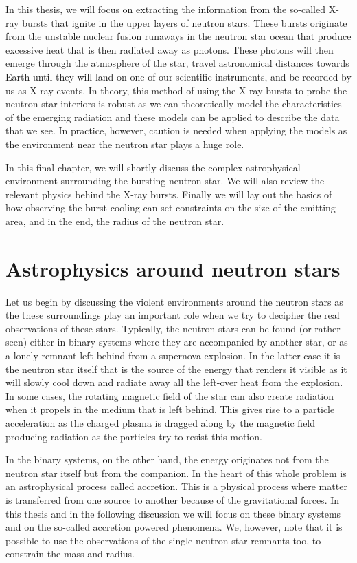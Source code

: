 In this thesis, we will focus on extracting the information from the so-called X-ray bursts that ignite in the upper layers of neutron stars.
These bursts originate from the unstable nuclear fusion runaways in the neutron star ocean that produce excessive heat that is then radiated away as photons.
These photons will then emerge through the atmosphere of the star, travel astronomical distances towards Earth until they will land on one of our scientific instruments, and be recorded by us as X-ray events.
In theory, this method of using the X-ray bursts to probe the neutron star interiors is robust as we can theoretically model the characteristics of the emerging radiation and these models can be applied to describe the data that we see. 
In practice, however, caution is needed when applying the models as the environment near the neutron star plays a huge role.

In this final chapter, we will shortly discuss the complex astrophysical environment surrounding the bursting neutron star.
We will also review the relevant physics behind the X-ray bursts.
Finally we will lay out the basics of how observing the burst cooling can set constraints on the size of the emitting area, and in the end, the radius of the neutron star.



\section{Astrophysics around neutron stars}
Let us begin by discussing the violent environments around the neutron stars as the these surroundings play an important role when we try to decipher the real observations of these stars.
Typically, the neutron stars can be found (or rather seen) either in binary systems where they are accompanied by another star, or as a lonely remnant left behind from a supernova explosion.
In the latter case it is the neutron star itself that is the source of the energy that renders it visible as it will slowly cool down and radiate away all the left-over heat from the explosion.
In some cases, the rotating magnetic field of the star can also create radiation when it propels in the medium that is left behind.
This gives rise to a particle acceleration as the charged plasma is dragged along by the magnetic field producing radiation as the particles try to resist this motion.


In the binary systems, on the other hand, the energy originates not from the neutron star itself but from the companion.
In the heart of this whole problem is an astrophysical process called accretion.
This is a physical process where matter is transferred from one source to another because of the gravitational forces.
In this thesis and in the following discussion we will focus on these binary systems and on the so-called accretion powered phenomena.
We, however, note that it is possible to use the observations of the single neutron star remnants too, to constrain the mass and radius.\cite[see, e.g.,][]{PR06}


